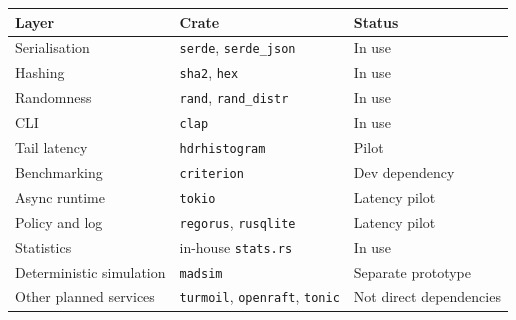 \begin{tabular}{|p{55pt}|p{85pt}|p{60pt}|}
\hline
\textbf{Layer} & \textbf{Crate} & \textbf{Status} \\
\hline
Serialisation & \texttt{serde}, \texttt{serde\_json} & In use \\
Hashing & \texttt{sha2}, \texttt{hex} & In use \\
Randomness & \texttt{rand}, \texttt{rand\_distr} & In use \\
CLI & \texttt{clap} & In use \\
Tail latency & \texttt{hdrhistogram} & Pilot \\
Benchmarking & \texttt{criterion} & Dev dependency \\
Async runtime & \texttt{tokio} & Latency pilot \\
Policy and log & \texttt{regorus}, \texttt{rusqlite} & Latency pilot \\
Statistics & in-house \texttt{stats.rs} & In use \\
Deterministic simulation & \texttt{madsim} & Separate prototype \\
Other planned services & \texttt{turmoil}, \texttt{openraft}, \texttt{tonic} & Not direct dependencies \\
\hline
\end{tabular}
